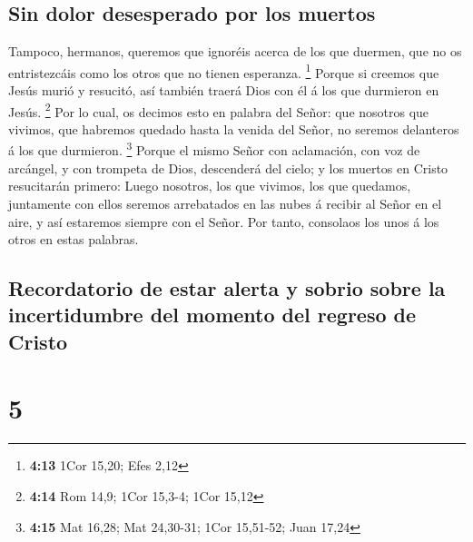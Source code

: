 \hypertarget{sin-dolor-desesperado-por-los-muertos}{%
\subsection{Sin dolor desesperado por los
muertos}\label{sin-dolor-desesperado-por-los-muertos}}

 Tampoco, hermanos, queremos que ignoréis acerca de los que
duermen, que no os entristezcáis como los otros que no tienen esperanza.
\footnote{\textbf{4:13} 1Cor 15,20; Efes 2,12}  Porque si
creemos que Jesús murió y resucitó, así también traerá Dios con él á los
que durmieron en Jesús. \footnote{\textbf{4:14} Rom 14,9; 1Cor 15,3-4;
  1Cor 15,12}  Por lo cual, os decimos esto en palabra del
Señor: que nosotros que vivimos, que habremos quedado hasta la venida
del Señor, no seremos delanteros á los que durmieron. \footnote{\textbf{4:15}
  Mat 16,28; Mat 24,30-31; 1Cor 15,51-52; Juan 17,24} 
Porque el mismo Señor con aclamación, con voz de arcángel, y con
trompeta de Dios, descenderá del cielo; y los muertos en Cristo
resucitarán primero:  Luego nosotros, los que vivimos, los
que quedamos, juntamente con ellos seremos arrebatados en las nubes á
recibir al Señor en el aire, y así estaremos siempre con el Señor.
 Por tanto, consolaos los unos á los otros en estas
palabras.

\hypertarget{recordatorio-de-estar-alerta-y-sobrio-sobre-la-incertidumbre-del-momento-del-regreso-de-cristo}{%
\subsection{Recordatorio de estar alerta y sobrio sobre la incertidumbre
del momento del regreso de
Cristo}\label{recordatorio-de-estar-alerta-y-sobrio-sobre-la-incertidumbre-del-momento-del-regreso-de-cristo}}

\hypertarget{section-4}{%
\section{5}\label{section-4}}

